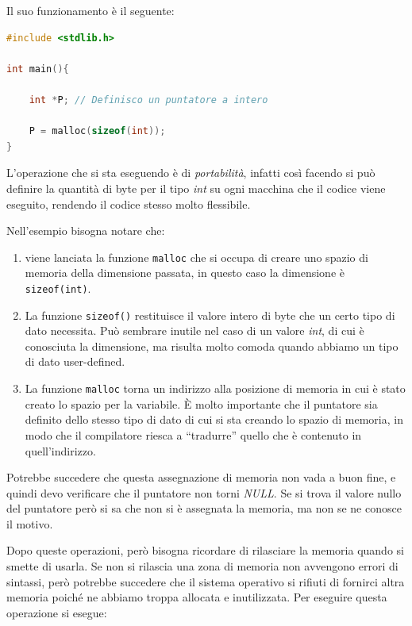 \documentclass[
  paper=a4,
  oneside  ,captions=tableheading
]{scrbook}
\newcommand{\passthrough}[1]{#1}
\providecommand{\tightlist}{%
  \setlength{\itemsep}{0pt}\setlength{\parskip}{0pt}}
\begin{document}
Il suo funzionamento è il seguente:

\begin{lstlisting}[language=C]
#include <stdlib.h>

int main(){
    
    int *P; // Definisco un puntatore a intero
    
    P = malloc(sizeof(int));
}
\end{lstlisting}

L'operazione che si sta eseguendo è di \emph{portabilità}, infatti così
facendo si può definire la quantità di byte per il tipo \emph{int} su
ogni macchina che il codice viene eseguito, rendendo il codice stesso
molto flessibile.

Nell'esempio bisogna notare che:

\begin{enumerate}
\def\labelenumi{\arabic{enumi}.}
\tightlist
\item
  viene lanciata la funzione \passthrough{\lstinline!malloc!} che si
  occupa di creare uno spazio di memoria della dimensione passata, in
  questo caso la dimensione è \passthrough{\lstinline!sizeof(int)!}.
\item
  La funzione \passthrough{\lstinline!sizeof()!} restituisce il valore
  intero di byte che un certo tipo di dato necessita. Può sembrare
  inutile nel caso di un valore \emph{int}, di cui è conosciuta la
  dimensione, ma risulta molto comoda quando abbiamo un tipo di dato
  user-defined.
\item
  La funzione \passthrough{\lstinline!malloc!} torna un indirizzo alla
  posizione di memoria in cui è stato creato lo spazio per la variabile.
  È molto importante che il puntatore sia definito dello stesso tipo di
  dato di cui si sta creando lo spazio di memoria, in modo che il
  compilatore riesca a ``tradurre'' quello che è contenuto in
  quell'indirizzo.
\end{enumerate}

Potrebbe succedere che questa assegnazione di memoria non vada a buon
fine, e quindi devo verificare che il puntatore non torni \emph{NULL}.
Se si trova il valore nullo del puntatore però si sa che non si è
assegnata la memoria, ma non se ne conosce il motivo.

Dopo queste operazioni, però bisogna ricordare di rilasciare la memoria
quando si smette di usarla. Se non si rilascia una zona di memoria non
avvengono errori di sintassi, però potrebbe succedere che il sistema
operativo si rifiuti di fornirci altra memoria poiché ne abbiamo troppa
allocata e inutilizzata. Per eseguire questa operazione si esegue:
\end{document}
